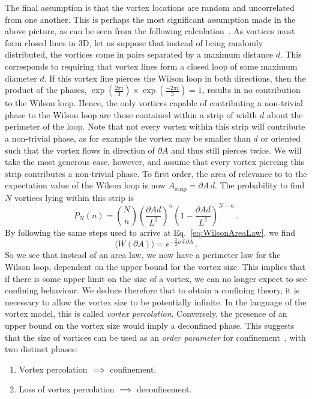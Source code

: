 The final assumption is that the vortex locations are random and uncorrelated from one another. This is perhaps the most significant assumption made in the above picture, as can be seen from the following calculation~\cite{Engelhardt:1999fd}. As vortices must form closed lines in 3D, let us suppose that instead of being randomly distributed, the vortices come in pairs separated by a maximum distance $d$. This corresponds to requiring that vortex lines form a closed loop of some maximum diameter $d$. If this vortex line pierces the Wilson loop in both directions, then the product of the phases, $\exp\left(\frac{2\pi i}{3}\right)\times \exp\left(\frac{-2\pi i}{3}\right) = 1$, results in no contribution to the Wilson loop. Hence, the only vortices capable of contributing a non-trivial phase to the Wilson loop are those contained within a strip of width $d$ about the perimeter of the loop. Note that not every vortex within this strip will contribute a non-trivial phase, as for example the vortex may be smaller than $d$ or oriented such that the vortex flows in direction of $\partial A$ and thus still pierces twice. We will take the most generous case, however, and assume that every vortex piercing this strip contributes a non-trivial phase. To first order, the area of relevance to to the expectation value of the Wilson loop is now $A_\text{strip}=\partial A\, d$. The probability to find $N$ vortices lying within this strip is 
%
\begin{equation}
P_N(n) = {N\choose n} \left(\frac{\partial A d}{L^2}\right)^n \left(1-\frac{\partial A d}{L^2}\right)^{N-n}\, .
\end{equation}
%
By following the same steps used to arrive at Eq.~\ref{eq:WilsonAreaLaw}, we find
%
\begin{equation}
\langle W(\partial A)\rangle = e^{-\frac{3}{2}\rho\, d\, \partial A}\, .
\end{equation}
%
So we see that instead of an area law, we now have a perimeter law for the Wilson loop, dependent on the upper bound for the vortex size. This implies that if there is some upper limit on the size of a vortex, we can no longer expect to see confining behaviour. We deduce therefore that to obtain a confining theory, it is necessary to allow the vortex size to be potentially infinite. In the language of the vortex model, this is called \textit{vortex percolation}. Conversely, the presence of an upper bound on the vortex size would imply a deconfined phase. This suggests that the size of vortices can be used as an \textit{order parameter} for confinement~\cite{Langfeld:1998cz}, with two distinct phases:
\begin{enumerate}
\item Vortex percolation $\implies$ confinement.
\item Loss of vortex percolation $\implies$ deconfinement.
\end{enumerate}
